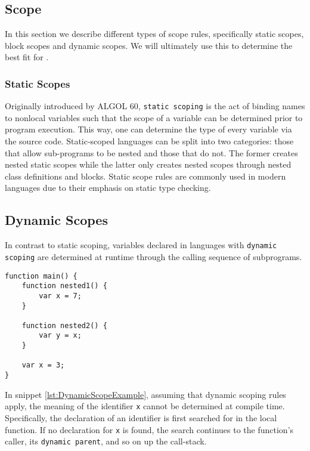 \subsection{Scope}
In this section we describe different types of scope rules, specifically static scopes, block scopes and dynamic scopes.
We will ultimately use this to determine the best fit for \dazel{}.

\subsubsection{Static Scopes}
Originally introduced by ALGOL 60\cite{backus_revised_1963}, \texttt{static scoping} is the act of binding names to nonlocal variables such that the scope of a variable
can be determined prior to program execution. This way, one can determine the type of every variable via the source code.
Static-scoped languages can be split into two categories: those that allow sub-programs to be nested and those that do not.
The former creates nested static scopes while the latter only creates nested scopes through nested class definitions and blocks.
Static scope rules are commonly used in modern languages due to their emphasis on static type checking\cite{sebesta_concepts_2016}.

\subsection{Dynamic Scopes}
In contrast to static scoping, variables declared in languages with \texttt{dynamic scoping} are determined at runtime through the calling sequence of subprograms.

\begin{lstlisting}[caption={Example of dynamic scoping}, label={lst:DynamicScopeExample}]
function main() {
	function nested1() {
		var x = 7;
	}
	
	function nested2() {
		var y = x;
	}

	var x = 3; 
}
\end{lstlisting}

In snippet \ref{lst:DynamicScopeExample}, assuming that dynamic scoping rules apply, the meaning of the identifier \texttt{x} cannot be determined at compile time.
Specifically, the declaration of an identifier is first searched for in the local function.
If no declaration for \texttt{x} is found, the search continues to the function's caller, its \texttt{dynamic parent}, and so on up the call-stack\cite{sebesta_concepts_2016}.

